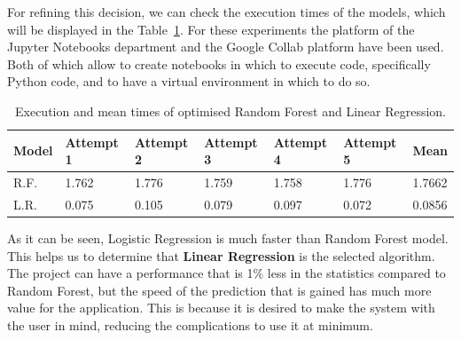 For refining this decision, we can check the execution times of the models, which will be displayed in the Table~\ref{tab:timestatistics}. For these experiments the platform of the Jupyter Notebooks department and the Google Collab platform have been used. Both of which allow to create notebooks in which to execute code, specifically Python code, and to have a virtual environment in which to do so.

\begin{table}[h]
\begin{tabular}{|l|l|l|l|l|l|l|}
\hline
\textbf{Model}      & \textbf{Attempt 1} & \textbf{Attempt 2} & \textbf{Attempt 3} & \textbf{Attempt 4} & \textbf{Attempt 5} & \textbf{Mean} \\ \hline
R.F.       & 1.762              & 1.776              & 1.759              & 1.758              & 1.776              & 1.7662             \\ \hline
L.R. & 0.075              & 0.105              & 0.079              & 0.097              & 0.072              & 0.0856             \\ \hline
\end{tabular}
\caption{Execution and mean times of optimised Random Forest and Linear Regression.}
\label{tab:timestatistics}
\end{table}

As it can be seen, Logistic Regression is much faster than Random Forest model. This helps us to determine that \textbf{Linear Regression} is the selected algorithm. The project can have a performance that is 1\% less in the statistics compared to Random Forest, but the speed of the prediction that is gained has much more value for the application. This is because it is desired to make the system with the user in mind, reducing the complications to use it at minimum.

